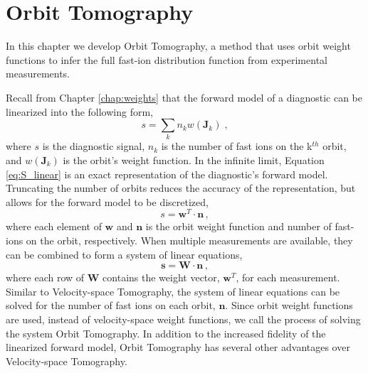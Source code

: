 \chapter{Orbit Tomography}\label{chap:orbit_tomography}

In this chapter we develop Orbit Tomography, a method that uses orbit weight functions to infer the full fast-ion distribution function from experimental measurements.

Recall from Chapter \ref{chap:weights} that the forward model of a diagnostic can be linearized into the following form,
\begin{equation}\label{eq:S_linear}
    s = \sum_k n_k w(\mathbf{J}_k) \;,
\end{equation}
where $s$ is the diagnostic signal, $n_k$ is the number of fast ions on the k$^{th}$ orbit, and $w(\mathbf{J}_k)$ is the orbit's weight function.
In the infinite limit, Equation \ref{eq:S_linear} is an exact representation of the diagnostic's forward model. Truncating the number of orbits reduces the accuracy of the representation, but allows for the forward model to be discretized,
\begin{equation}
    s = \mathbf{w}^T\cdot\mathbf{n}\,,
\end{equation}
where each element of $\mathbf{w}$ and $\mathbf{n}$ is the orbit weight function and number of fast-ions on the orbit, respectively. When multiple measurements are available, they can be combined to form a system of linear equations,
\begin{equation}\label{eq:Wxn}
    \mathbf{s} = \mathbf{W}\cdot\mathbf{n}\,,
\end{equation}
where each row of $\mathbf{W}$ contains the weight vector, $\mathbf{w}^T$, for each measurement. Similar to Velocity-space Tomography, the system of linear equations can be solved for the number of fast ions on each orbit, $\mathbf{n}$. Since orbit weight functions are used, instead of velocity-space weight functions, we call the process of solving the system Orbit Tomography.
In addition to the increased fidelity of the linearized forward model, Orbit Tomography has several other advantages over Velocity-space Tomography.

